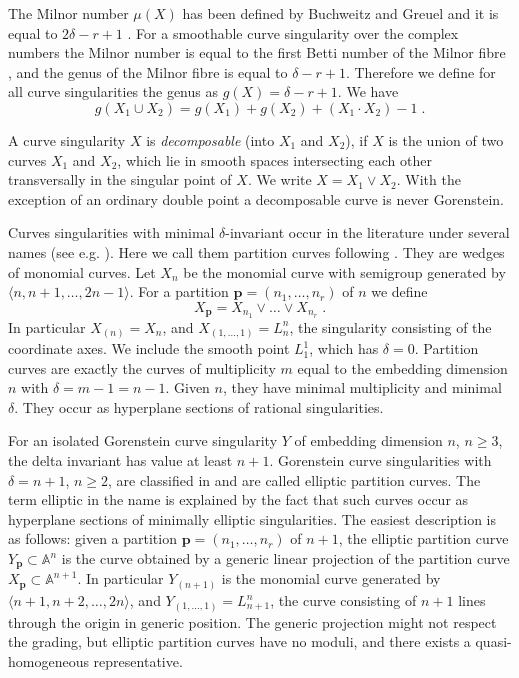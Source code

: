 \documentclass[12pt,a4paper]{amsart}  %
\newcommand{\A}{\mathbb{A}}
\theoremstyle{definition}
\theoremstyle{remark}
\begin{document}
The Milnor number $\mu(X)$  has been defined by Buchweitz and Greuel and it is equal to 
$2\delta-r+1$ \cite[Prop. 1.2.1]{BG}. For a smoothable curve singularity
over the complex numbers the Milnor number is equal to the first Betti number of
the Milnor fibre \cite[Cor. 4.2.3]{BG}, and the genus of the Milnor fibre
is equal to $\delta-r+1$. Therefore we define for all curve singularities the genus
as $g(X)=\delta-r+1$. We have 
\begin{equation}\label{eq:genus-of-union}
g(X_1\cup X_2)=g(X_1)+g(X_2)+(X_1\cdot X_2)-1\;.
\end{equation}

A curve singularity $X$ is \textit{decomposable} (into
$X_1$ and $X_2$), if $X$ is the union of two curves $X_1$ and $X_2$, which 
lie in smooth spaces intersecting each other transversally in the
singular point of $X$. We write $X=X_1 \vee X_2$.
With the exception of an ordinary double point 
a decomposable curve  is never Gorenstein.

Curves singularities with minimal $\delta$-invariant occur in the literature
under several names (see e.g. \cite{St}). Here we call them partition curves
following \cite{BC1}.  They are wedges of monomial curves. Let $X_n$ be the
monomial curve with semigroup generated by $\langle n,n+1,\dots,2n-1\rangle$.
For a partition $\boldsymbol{p}=(n_1,\dots,n_r)$ of $n$ we define
\[
X_{\boldsymbol{p}} = X_{n_1}\vee \dots \vee X_{n_r}\;.
\]
In particular $X_{(n)}=X_n$, and $X_{(1,\dots,1)}=L_n^n$, the singularity
consisting of the coordinate axes. We include the smooth point $L_1^1$, which has
$\delta= 0$.
Partition curves are exactly the curves of multiplicity $m$ equal to the
embedding dimension $n$ with $\delta = m-1 = n-1$. Given $n$, they have  
minimal multiplicity and minimal $\delta$. They occur as hyperplane sections of rational singularities.


For an isolated Gorenstein curve singularity $Y$ of embedding dimension
$n$,  $n\geq3$, the delta invariant has value at least $n + 1$. 
Gorenstein curve singularities  with $\delta= n + 1$, $n\geq 2$, are classified
in \cite{BC} and are called elliptic partition curves. The term elliptic in the name is explained by the fact
that such curves occur as hyperplane sections of minimally elliptic
singularities.
The easiest description is as follows: given a partition 
$\boldsymbol{p}=(n_1,\dots,n_r)$ of $n+1$, the elliptic partition curve
$Y_{\boldsymbol{p}} \subset \A^n$ is the curve obtained by a generic linear
projection of  the partition curve
$X_{\boldsymbol{p}}   \subset \A^{n+1}$.  In particular $Y_{(n+1)}$ is the
monomial curve generated by  $\langle n+1,n+2,\dots,2n\rangle$, and 
$Y_{(1,\dots,1)}=L^n_{n+1}$,  the curve consisting of $n+1$ lines through
the origin in generic position. The generic projection might not respect the grading,
but elliptic partition curves have no moduli, and there exists a
quasi-homogeneous representative. 
\end{document}
